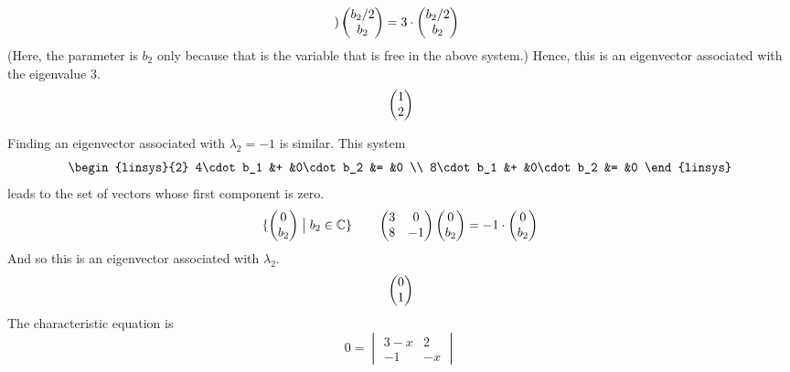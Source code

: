 \begin{exercises}
\begin{answer}
\begin{exparts}
\begin{equation*}
\begin{pmatrix}
             \end{pmatrix}
             \begin{pmatrix} b_2/2  \\ b_2 \end{pmatrix}
             =3\cdot\begin{pmatrix} b_2/2 \\ b_2 \end{pmatrix}
           \end{equation*}
           (Here, the parameter is $b_2$ only because that is the variable that
           is free in the above system.)
           Hence, this is an eigenvector associated with the eigenvalue $3$.
           \begin{equation*}
             \begin{pmatrix} 1 \\ 2 \end{pmatrix}
           \end{equation*}

           Finding an eigenvector associated with $\lambda_2=-1$ is similar.
           This system
           \begin{equation*}
             \begin{linsys}{2}
               4\cdot b_1  &+  &0\cdot b_2  &=  &0  \\
               8\cdot b_1  &+  &0\cdot b_2 &=  &0
             \end{linsys}
           \end{equation*}
           leads to the set of vectors whose first component is 
           zero.
           \begin{equation*}
             \mbox{$\{\begin{pmatrix} 0 \\ b_2 \end{pmatrix}\bigm| b_2\in\mathbb{C}\}$}
             \qquad
             \begin{pmatrix}
               3  &0  \\
               8  &-1
             \end{pmatrix}
             \begin{pmatrix} 0  \\ b_2 \end{pmatrix}
             =-1\cdot\begin{pmatrix} 0 \\ b_2 \end{pmatrix}
           \end{equation*}
           And so this is an eigenvector associated with $\lambda_2$.
           \begin{equation*}
             \begin{pmatrix} 0 \\ 1 \end{pmatrix}
           \end{equation*}
         \partsitem The characteristic equation is
           \begin{equation*}
             0=
             \begin{vmatrix}
               3-x  &2  \\
               -1   &-x               
             \end{vmatrix}

\end{equation*}
\end{exparts}
\end{answer}
\end{exercises}
